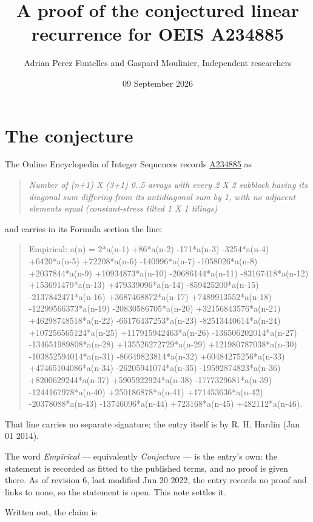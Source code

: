 \documentclass[11pt]{article}
\title{A proof of the conjectured linear recurrence for OEIS A234885}
\author{Adrian Perez Fontelles and Gaspard Moulinier, Independent researchers}
\date{09 September 2026}
\theoremstyle{definition}
\begin{document}
\maketitle
\section{The conjecture}

The Online Encyclopedia of Integer Sequences records \href{https://oeis.org/A234885}{A234885} as

\begin{quote}\itshape Number of (n+1) X (3+1) 0..5 arrays with every 2 X 2 subblock having its diagonal sum differing from its antidiagonal sum by 1, with no adjacent elements equal (constant-stress tilted 1 X 1 tilings)\end{quote}

and carries in its Formula section the line:

\begin{quote}\ttfamily Empirical: a(n) = 2*a(n-1) +86*a(n-2) -171*a(n-3) -3254*a(n-4) +6420*a(n-5) +72208*a(n-6) -140996*a(n-7) -1058026*a(n-8) +2037844*a(n-9) +10934873*a(n-10) -20686144*a(n-11) -83167418*a(n-12) +153691479*a(n-13) +479339096*a(n-14) -859425200*a(n-15) -2137842471*a(n-16) +3687468872*a(n-17) +7489913552*a(n-18) -12299566373*a(n-19) -20830586705*a(n-20) +32156843576*a(n-21) +46298748518*a(n-22) -66176437253*a(n-23) -82513440614*a(n-24) +107256565124*a(n-25) +117915942463*a(n-26) -136506202014*a(n-27) -134651989808*a(n-28) +135526272729*a(n-29) +121980787038*a(n-30) -103852594014*a(n-31) -86649823814*a(n-32) +60484275256*a(n-33) +47465104086*a(n-34) -26205941074*a(n-35) -19592874823*a(n-36) +8200629244*a(n-37) +5905922924*a(n-38) -1777329681*a(n-39) -1244167978*a(n-40) +250186878*a(n-41) +171453636*a(n-42) -20378088*a(n-43) -13746096*a(n-44) +723168*a(n-45) +482112*a(n-46).\end{quote}

That line carries no separate signature; the entry itself is by R. H. Hardin (Jan 01 2014).

The word {\itshape Empirical} --- equivalently {\itshape Conjecture} --- is the entry's own: the statement is recorded as fitted to the published terms, and no proof is given there. As of revision 6, last modified Jun 20 2022, the entry records no proof and links to none, so the statement is open. This note settles it.

Written out, the claim is
\end{document}
